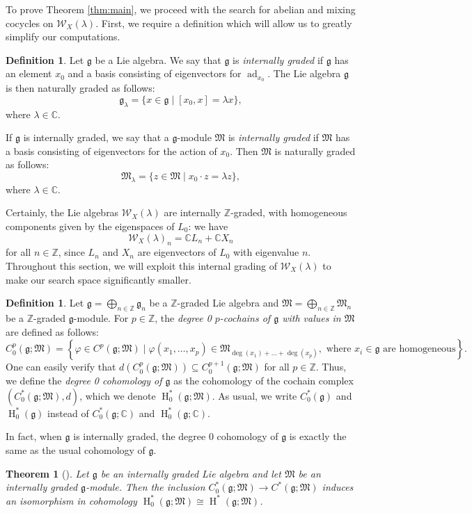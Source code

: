 \documentclass[11pt, svgnames]{amsart}
\DeclareMathOperator{\ad}{ad}
\newcommand{\g}{\ensuremath{\mathfrak{g}}}
\newcommand{\M}{\mathfrak{M}}
\newcommand{\ZZ}{\mathbb{Z}}
\newcommand{\CC}{\mathbb{C}}
\newcommand{\W}{\mathcal{W}}
\DeclareMathOperator{\HH}{H}
\newtheorem{theorem}[proposition]{Theorem}
\theoremstyle{definition}
\newtheorem{defn}[proposition]{Definition}
\begin{document}
To prove Theorem \ref{thm:main}, we proceed with the search for abelian and mixing cocycles on $\W_X(\lambda)$. First, we require a definition which will allow us to greatly simplify our computations.

\begin{defn}\label{def:internally graded}
    Let $\g$ be a Lie algebra. We say that $\g$ is \emph{internally graded} if $\g$ has an element $x_0$ and a basis consisting of eigenvectors for $\ad_{x_0}$. The Lie algebra $\g$ is then naturally graded as follows:
    $$\g_\lambda = \{x \in \g \mid [x_0,x] = \lambda x\},$$
    where $\lambda \in \CC$. 
    
    If $\g$ is internally graded, we say that a $\g$-module $\M$ is \emph{internally graded} if $\M$ has a basis consisting of eigenvectors for the action of $x_0$. Then $\M$ is naturally graded as follows:
    $$\M_\lambda = \{z \in \M \mid x_0 \cdot z = \lambda z\},$$
    where $\lambda \in \CC$.
\end{defn}

Certainly, the Lie algebras $\W_X(\lambda)$ are internally $\ZZ$-graded, with homogeneous components given by the eigenspaces of $L_0$: we have 
$$\W_X(\lambda)_n = \CC L_n + \CC X_n$$
for all $n \in \ZZ$, since $L_n$ and $X_n$ are eigenvectors of $L_0$ with eigenvalue $n$. Throughout this section, we will exploit this internal grading of $\W_X(\lambda)$ to make our search space significantly smaller.

\begin{defn}
    Let $\g = \bigoplus_{n \in \ZZ} \g_n$ be a $\ZZ$-graded Lie algebra and $\M = \bigoplus_{n \in \ZZ} \M_n$ be a $\ZZ$-graded $\g$-module. For $p \in \ZZ$, the \emph{degree 0 $p$-cochains of $\g$ with values in $\M$} are defined as follows:
    $$C_0^p(\g;\M) = \left\{\varphi \in C^p(\g;\M) \mid \varphi(x_1,\ldots,x_p) \in \M_{\deg(x_1) + \ldots + \deg(x_p)}, \text{ where } x_i \in \g \text{ are homogeneous}\right\}.$$
    One can easily verify that $d(C_0^p(\g;\M)) \subseteq C_0^{p+1}(\g;\M)$ for all $p \in \ZZ$. Thus, we define the \emph{degree 0 cohomology of $\g$} as the cohomology of the cochain complex $(C_0^*(\g;\M),d)$, which we denote $\HH_0^*(\g;\M)$. As usual, we write $C_0^*(\g)$ and $\HH_0^*(\g)$ instead of $C_0^*(\g;\CC)$ and $\HH_0^*(\g;\CC)$.
\end{defn}

In fact, when $\g$ is internally graded, the degree 0 cohomology of $\g$ is exactly the same as the usual cohomology of $\g$.

\begin{theorem}[{\cite[Theorem 1.5.2]{Fuchs}}]\label{thm:internal grading}
    Let $\g$ be an internally graded Lie algebra and let $\M$ be an internally graded $\g$-module. Then the inclusion $C_0^*(\g;\M) \to C^*(\g;\M)$ induces an isomorphism in cohomology $\HH_0^*(\g;\M) \cong \HH^*(\g;\M)$.
\end{theorem}
\end{document}
